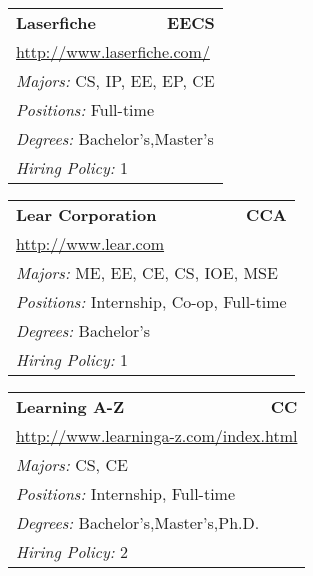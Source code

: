 \documentclass[twoside]{article}
\begin{document}
\begin{center}
\begin{multicols}{3}
\begin{FlushLeft}
\begin{minipage}{.9\columnwidth}
\end{minipage}
 
\begin{minipage}{.9\columnwidth}\begin{tabularx}{.95\columnwidth}{Xr}
                 {\Large\bf Laserfiche} & {\Large\bf EECS}\\
    \multicolumn{2}{p{.95\columnwidth}}{\url{http://www.laserfiche.com/}}\\
    \multicolumn{2}{p{.95\columnwidth}}{\emph{Majors:} CS, IP, EE, EP, CE}\\
    \multicolumn{2}{p{.95\columnwidth}}{\emph{Positions:} Full-time}\\
    \multicolumn{2}{p{.95\columnwidth}}{\emph{Degrees:} Bachelor's,Master's}\\
    \multicolumn{2}{p{.95\columnwidth}}{\emph{Hiring Policy:} 1}\\
    \end{tabularx}
    
\end{minipage}
 
\begin{minipage}{.9\columnwidth}\begin{tabularx}{.95\columnwidth}{Xr}
                 {\Large\bf Lear Corporation} & {\Large\bf CCA}\\
    \multicolumn{2}{p{.95\columnwidth}}{\url{http://www.lear.com}}\\
    \multicolumn{2}{p{.95\columnwidth}}{\emph{Majors:} ME, EE, CE, CS, IOE, MSE}\\
    \multicolumn{2}{p{.95\columnwidth}}{\emph{Positions:} Internship, Co-op, Full-time}\\
    \multicolumn{2}{p{.95\columnwidth}}{\emph{Degrees:} Bachelor's}\\
    \multicolumn{2}{p{.95\columnwidth}}{\emph{Hiring Policy:} 1}\\
    \end{tabularx}
    
\end{minipage}
 
\begin{minipage}{.9\columnwidth}\begin{tabularx}{.95\columnwidth}{Xr}
                 {\Large\bf Learning A-Z} & {\Large\bf CC}\\
    \multicolumn{2}{p{.95\columnwidth}}{\url{http://www.learninga-z.com/index.html}}\\
    \multicolumn{2}{p{.95\columnwidth}}{\emph{Majors:} CS, CE}\\
    \multicolumn{2}{p{.95\columnwidth}}{\emph{Positions:} Internship, Full-time}\\
    \multicolumn{2}{p{.95\columnwidth}}{\emph{Degrees:} Bachelor's,Master's,Ph.D.}\\
    \multicolumn{2}{p{.95\columnwidth}}{\emph{Hiring Policy:} 2}\\
    \end{tabularx}
    

\end{minipage}
\end{FlushLeft}
\end{multicols}
\end{center}
\end{document}
